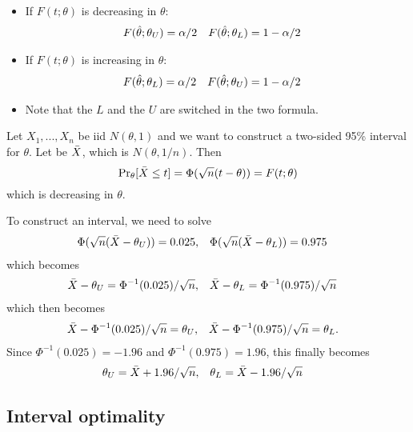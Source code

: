 \begin{itemize}[leftmargin=0pt]
  \begin{itemize}
  \item If $F(t; \theta)$ is decreasing in $\theta$:
    \begin{align*}
      F(\hat{\theta}; \theta_U) &= \alpha/2 & F(\hat{\theta}; \theta_L) &= 1 - \alpha/2
    \end{align*}
  \item If $F(t; \theta)$ is increasing in $\theta$:
    \begin{align*}
      F(\hat{\theta}; \theta_L) &= \alpha/2 & F(\hat{\theta}; \theta_U) &= 1 - \alpha/2
    \end{align*}
  \item Note that the $L$ and the $U$ are switched in the two formula.
  \end{itemize}

  \begin{ex} Let $X_1,...,X_n$ be iid $N(\theta, 1)$ and we want to
    construct a two-sided 95\% interval for $\theta$.  Let be $\bar{X}$, which
    is $N(\theta, 1/n)$.  Then
    \begin{equation*}
      \operatorname{Pr}_\theta[\bar{X} \leq t] = \Phi(\sqrt{n} (t - \theta)) = F(t; \theta)
    \end{equation*}
    which is decreasing in $\theta$.

    To construct an interval, we need to solve
    \begin{align*}
      \Phi(\sqrt{n} (\bar{X} - \theta_U)) &= 0.025, &
      \Phi(\sqrt{n} (\bar{X} - \theta_L)) &= 0.975
    \end{align*}
    which becomes
    \begin{align*}
      \bar{X} - \theta_U &= \Phi^{-1}(0.025) / \sqrt{n}, &
      \bar{X} - \theta_L &= \Phi^{-1}(0.975) / \sqrt{n}
    \end{align*}
    which then becomes
    \begin{align*}
      \bar{X} - \Phi^{-1}(0.025) / \sqrt{n} &= \theta_U, &
      \bar{X} - \Phi^{-1}(0.975) / \sqrt{n} &= \theta_L.
    \end{align*}
    Since $\Phi^{-1}(0.025) = -1.96$ and $\Phi^{-1}(0.975) = 1.96$, this
    finally becomes
    \begin{align*}
      \theta_U &= \bar{X} + 1.96 / \sqrt{n}, &
      \theta_L &= \bar{X} - 1.96 / \sqrt{n}
    \end{align*}
  \end{ex}

\end{itemize}

\subsection{Interval optimality}

